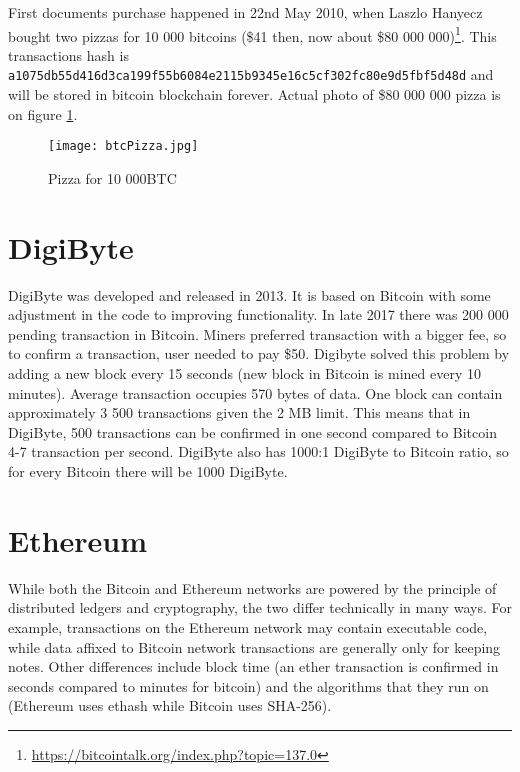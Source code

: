 First documents purchase happened in 22nd May 2010, when Laszlo Hanyecz bought two pizzas for 10 000 bitcoins (\$41 then, now about \$80 000 000)\footnote{\url{https://bitcointalk.org/index.php?topic=137.0}}. This transactions hash is \texttt{a1075db55d416d3ca199f55b6084e\-2115b9345e16c5cf302fc80e9d5fbf5d48d} and will be stored in bitcoin blockchain forever. Actual photo of \$80 000 000 pizza is on figure \ref{bitcoinPizza}. 

\begin{figure}[h]
    \centering
    \texttt{[image: btcPizza.jpg]}
    \caption{Pizza for 10 000BTC}
    \label{bitcoinPizza}
\end{figure}


\section{DigiByte}
DigiByte was developed and released in 2013. It is based on Bitcoin with some adjustment in the code to improving functionality. In late 2017 there was 200 000 pending transaction in Bitcoin. Miners preferred transaction with a bigger fee, so to confirm a transaction, user needed to pay \$50. Digibyte solved this problem by adding a new block every 15 seconds (new block in Bitcoin is mined every 10 minutes). Average transaction occupies 570 bytes of data. One block can contain approximately 3 500 transactions given the 2 MB limit. This means that in DigiByte, 500 transactions can be confirmed in one second compared to Bitcoin 4-7 transaction per second. DigiByte also has 1000:1 DigiByte to Bitcoin ratio, so for every Bitcoin there will be 1000 DigiByte.


\section{Ethereum}
While both the Bitcoin and Ethereum networks are powered by the principle of distributed ledgers and cryptography, the two differ technically in many ways. For example, transactions on the Ethereum network may contain executable code, while data affixed to Bitcoin network transactions are generally only for keeping notes. Other differences include block time (an ether transaction is confirmed in seconds compared to minutes for bitcoin) and the algorithms that they run on (Ethereum uses ethash while Bitcoin uses SHA-256). 



